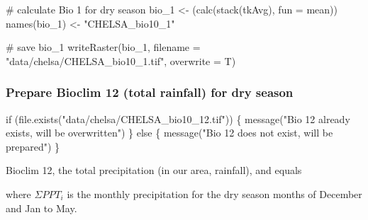 \documentclass[
]{article}
\newenvironment{Shaded}{}{}
\newcommand{\CommentTok}[1]{\textcolor[rgb]{0.00,0.50,0.00}{#1}}
\newcommand{\ControlFlowTok}[1]{\textcolor[rgb]{0.00,0.00,1.00}{#1}}
\newcommand{\DataTypeTok}[1]{#1}
\newcommand{\DecValTok}[1]{#1}
\newcommand{\KeywordTok}[1]{\textcolor[rgb]{0.00,0.00,1.00}{#1}}
\newcommand{\NormalTok}[1]{#1}
\newcommand{\StringTok}[1]{\textcolor[rgb]{0.00,0.50,0.50}{#1}}
\begin{document}
\begin{Shaded}
\begin{Highlighting}[]
\CommentTok{# calculate Bio 1 for dry season}
\NormalTok{bio_}\DecValTok{1}\NormalTok{ <-}\StringTok{ }\NormalTok{(}\KeywordTok{calc}\NormalTok{(}\KeywordTok{stack}\NormalTok{(tkAvg), }\DataTypeTok{fun =}\NormalTok{ mean))}
\KeywordTok{names}\NormalTok{(bio_}\DecValTok{1}\NormalTok{) <-}\StringTok{ "CHELSA_bio10_1"}

\CommentTok{# save bio_1}
\KeywordTok{writeRaster}\NormalTok{(bio_}\DecValTok{1}\NormalTok{, }\DataTypeTok{filename =} \StringTok{"data/chelsa/CHELSA_bio10_1.tif"}\NormalTok{, }\DataTypeTok{overwrite =}\NormalTok{ T)}
\end{Highlighting}
\end{Shaded}

\hypertarget{prepare-bioclim-12-total-rainfall-for-dry-season}{%
\subsubsection{Prepare Bioclim 12 (total rainfall) for dry season}\label{prepare-bioclim-12-total-rainfall-for-dry-season}}

\begin{Shaded}
\begin{Highlighting}[]
\ControlFlowTok{if}\NormalTok{ (}\KeywordTok{file.exists}\NormalTok{(}\StringTok{"data/chelsa/CHELSA_bio10_12.tif"}\NormalTok{)) \{}
  \KeywordTok{message}\NormalTok{(}\StringTok{"Bio 12 already exists, will be overwritten"}\NormalTok{)}
\NormalTok{\} }\ControlFlowTok{else}\NormalTok{ \{}
  \KeywordTok{message}\NormalTok{(}\StringTok{"Bio 12 does not exist, will be prepared"}\NormalTok{)}
\NormalTok{\}}
\end{Highlighting}
\end{Shaded}

Bioclim 12, the total precipitation (in our area, rainfall), and equals

where \(\Sigma PPT_i\) is the monthly precipitation for the dry season months of December and Jan to May.
\end{document}
